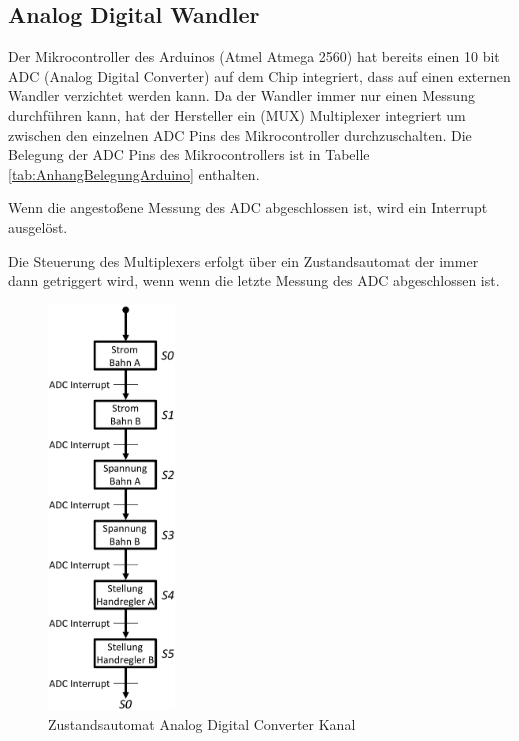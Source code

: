 \documentclass[a4paper, 11pt]{report}
\begin{document}
	\subsection{Analog Digital Wandler}

		Der Mikrocontroller des Arduinos (Atmel Atmega 2560) hat bereits einen 10 bit ADC (Analog Digital Converter) auf dem Chip integriert, dass auf einen externen Wandler verzichtet werden kann.
		Da der Wandler immer nur einen Messung durchführen kann, hat der Hersteller ein (MUX) Multiplexer integriert um zwischen den einzelnen ADC Pins des Mikrocontroller durchzuschalten.
		Die Belegung der ADC Pins des Mikrocontrollers ist in Tabelle \ref{tab:AnhangBelegungArduino} enthalten.

		Wenn die angestoßene Messung des ADC abgeschlossen ist, wird ein Interrupt ausgelöst.


		Die Steuerung des Multiplexers erfolgt über ein Zustandsautomat der immer dann getriggert wird, wenn wenn die letzte Messung des ADC abgeschlossen ist.

		\begin{figure}[ht]
			\centering
			\includegraphics[width=0.3\textwidth]{rec/ADCAutomat.png}
			\caption{Zustandsautomat Analog Digital Converter Kanal}
			\label{img:ADCMUX}
		\end{figure}
\end{document}
